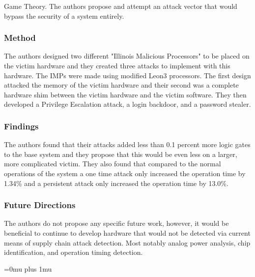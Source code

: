 \noindent
Game Theory.  The authors propose and attempt an attack vector that would bypass the security of a system entirely.

\subsubsection{Method}

\noindent
The authors designed two different "Illinois Malicious Processors" to be placed on the victim hardware and they created three attacks to implement with this hardware.  The IMPs were made using modified Leon3 processors.  The first design attacked the memory of the victim hardware and their second was a complete hardware shim between the victim hardware and the victim software. They then developed a Privilege Escalation attack, a login backdoor, and a password stealer.

\subsubsection{Findings}

\noindent
The authors found that their attacks added less than 0.1 percent more logic gates to the base system and they propose that this would be even less on a larger, more complicated victim.  They also found that compared to the normal operations of the system a one time attack only increased the operation time by 1.34\% and a persistent attack only increased the operation time by 13.0\%.  

\subsubsection{Future Directions}

\noindent
The authors do not propose any specific future work, however, it would be beneficial to continue to develop hardware that would not be detected via current means of supply chain attack detection.  Most notably analog power analysis, chip identification, and operation timing detection.

\Urlmuskip=0mu plus 1mu\relax
\pagebreak
